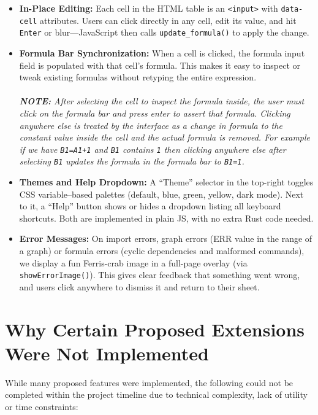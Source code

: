 \documentclass[12pt]{article}
\begin{document}
    \begin{itemize}
        \item \textbf{In-Place Editing:}
        Each cell in the HTML table is an \texttt{<input>} with \texttt{data-cell} attributes.
        Users can click directly in any cell, edit its value, and hit \texttt{Enter} or blur—JavaScript then calls \texttt{update\_formula()} to apply the change.

        \item \textbf{Formula Bar Synchronization:}
        When a cell is clicked, the formula input field is populated with that cell’s formula.
        This makes it easy to inspect or tweak existing formulas without retyping the entire expression. \\ \\
        \textit{\textbf{NOTE:} After selecting the cell to inspect the formula inside, the user must click on the formula bar and press enter to assert that formula. Clicking anywhere else is treated by the interface as a change in formula to the constant value inside the cell and the actual formula is removed. For example if we have \texttt{B1=A1+1} and \texttt{B1} contains \texttt{1} then clicking anywhere else after selecting \texttt{B1} updates the formula in the formula bar to \texttt{B1=1}.}

        \item \textbf{Themes and Help Dropdown:}
        A “Theme” selector in the top-right toggles CSS variable–based palettes (default, blue, green, yellow, dark mode).
        Next to it, a “Help” button shows or hides a dropdown listing all keyboard shortcuts.
        Both are implemented in plain JS, with no extra Rust code needed.

        \item \textbf{Error Messages:}
        On import errors, graph errors (ERR value in the range of a graph) or formula errors (cyclic dependencies and malformed commands), we display a fun Ferris-crab image in a full-page overlay (via \texttt{showErrorImage()}).
        This gives clear feedback that something went wrong, and users click anywhere to dismiss it and return to their sheet. \\
    \end{itemize}

    \section{Why Certain Proposed Extensions Were Not Implemented}
    \label{sec:not-implemented}
    While many proposed features were implemented, the following could not be completed within the project timeline due to technical complexity, lack of utility or time constraints:
\end{document}
